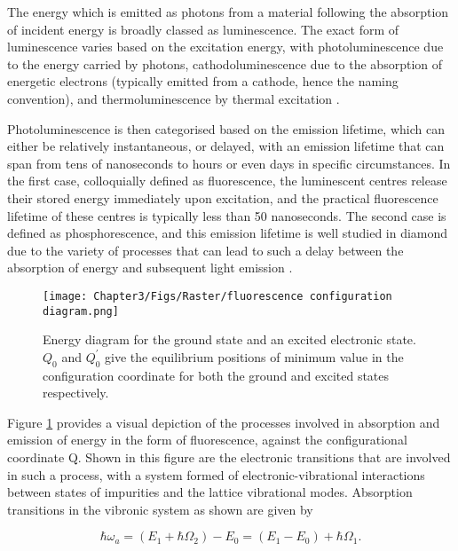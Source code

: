 The energy which is emitted as photons from a material following the absorption of incident energy is broadly classed as luminescence. The exact form of luminescence varies based on the excitation energy, with photoluminescence due to the energy carried by photons, cathodoluminescence due to the absorption of energetic electrons (typically emitted from a cathode, hence the naming convention), and thermoluminescence by thermal excitation \cite{mei2015}.

Photoluminescence is then categorised based on the emission lifetime, which can either be relatively instantaneous, or delayed, with an emission lifetime that can span from tens of nanoseconds to hours or even days in specific circumstances. In the first case, colloquially defined as fluorescence, the luminescent centres release their stored energy immediately upon excitation, and the practical fluorescence lifetime of these centres is typically less than 50 nanoseconds. The second case is defined as phosphorescence, and this emission lifetime is well studied in diamond due to the variety of processes that can lead to such a delay between the absorption of energy and subsequent light emission \cite{li2016}.

\begin{figure}[h]
    \centering
    \texttt{[image: Chapter3/Figs/Raster/fluorescence configuration diagram.png]}
    \caption{Energy diagram for the ground state and an excited electronic state. $Q_{0}$ and $Q_{0}^{\prime}$ give the equilibrium positions of minimum value in the configuration coordinate for both the ground and excited states respectively.}
    \label{fig:fluorescence_diagram}
\end{figure}

Figure \ref{fig:fluorescence_diagram} provides a visual depiction of the processes involved in absorption and emission of energy in the form of fluorescence, against the configurational coordinate Q. Shown in this figure are the electronic transitions that are involved in such a process, with a system formed of electronic-vibrational interactions between states of impurities and the lattice vibrational modes. Absorption transitions in the vibronic system as shown are given by

\begin{equation}
    \hbar\omega_{a}=\left(E_{1} + \hbar\Omega_{2}\right)-E_{0}=\left(E_{1}-E_{0}\right)+\hbar\Omega_{1}.
    \label{eq:fl_diagram_absorption}
\end{equation}


